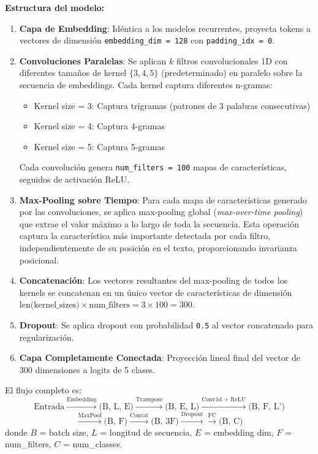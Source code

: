 \documentclass[paper=letter, fontsize=11pt, draft=false]{scrartcl}
\numberwithin{equation}{section} %
\numberwithin{figure}{section} %
\numberwithin{table}{section} %
\numberwithin{subsection}{section}
\begin{document}
\textbf{Estructura del modelo:}
\begin{enumerate}
    \item \textbf{Capa de Embedding}: Idéntica a los modelos recurrentes, proyecta tokens a vectores de dimensión \texttt{embedding\_dim = 128} con \texttt{padding\_idx = 0}.
    
    \item \textbf{Convoluciones Paralelas}: Se aplican $k$ filtros convolucionales 1D con diferentes tamaños de kernel $\{3, 4, 5\}$ (predeterminado) en paralelo sobre la secuencia de embeddings. Cada kernel captura diferentes n-gramas:
    \begin{itemize}
        \item Kernel size = 3: Captura trigramas (patrones de 3 palabras consecutivas)
        \item Kernel size = 4: Captura 4-gramas
        \item Kernel size = 5: Captura 5-gramas
    \end{itemize}
    Cada convolución genera \texttt{num\_filters = 100} mapas de características, seguidos de activación ReLU.
    
    \item \textbf{Max-Pooling sobre Tiempo}: Para cada mapa de características generado por las convoluciones, se aplica max-pooling global (\textit{max-over-time pooling}) que extrae el valor máximo a lo largo de toda la secuencia. Esta operación captura la característica más importante detectada por cada filtro, independientemente de su posición en el texto, proporcionando invarianza posicional.
    
    \item \textbf{Concatenación}: Los vectores resultantes del max-pooling de todos los kernels se concatenan en un único vector de características de dimensión $\text{len(kernel\_sizes)} \times \text{num\_filters} = 3 \times 100 = 300$.
    
    \item \textbf{Dropout}: Se aplica dropout con probabilidad \texttt{0.5} al vector concatenado para regularización.
    
    \item \textbf{Capa Completamente Conectada}: Proyección lineal final del vector de 300 dimensiones a logits de 5 clases.
\end{enumerate}

El flujo completo es:
\[
\text{Entrada} \xrightarrow{\text{Embedding}} \text{(B, L, E)} \xrightarrow{\text{Transpose}} \text{(B, E, L)} \xrightarrow{\text{Conv1d + ReLU}} \text{(B, F, L')}
\]
\[
\xrightarrow{\text{MaxPool}} \text{(B, F)} \xrightarrow{\text{Concat}} \text{(B, 3F)} \xrightarrow{\text{Dropout}} \xrightarrow{\text{FC}} \text{(B, C)}
\]
donde $B$ = batch size, $L$ = longitud de secuencia, $E$ = embedding dim, $F$ = num\_filters, $C$ = num\_classes.
\end{document}
